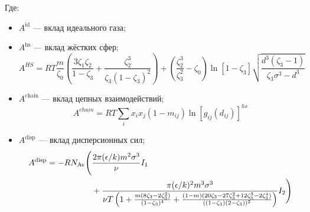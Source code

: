 \documentclass[a4paper,12pt]{article}
\begin{document}
    Где:
    \begin{itemize}
        \item \( A^{\text{id}} \) — вклад идеального газа;
        \item \( A^{\text{hs}} \) — вклад жёстких сфер;
          \[
          A^{HS} = RT \frac{m}{\zeta_0} \left( \frac{3 \zeta_1 \zeta_2}{1 - \zeta_3} + \frac{\zeta_2^3}{\zeta_3 (1 - \zeta_3)^2} \right) + \left( \frac{\zeta_2^3}{\zeta_3^2} - \zeta_0 \right) \ln [1 - \zeta_3] \sqrt{\frac{d^3 (\zeta_3 - 1)}{\zeta_3 \sigma^3 - d^3}}
          \]
        \item \( A^{\text{chain}} \) — вклад цепных взаимодействий;
          \[
          A^{chain} = RT \sum_i x_i x_j (1 - m_{ij}) \ln [g_{ij} (d_{ij})]^{hs}
          \]
        \item \( A^{\text{disp}} \) — вклад дисперсионных сил;
          \begin{align}
          A^{\text{disp}} = -RN_{\text{Av}} \Bigg( & \frac{2 \pi (\epsilon / k) m^2 \sigma^3}{\nu} I_1 \notag \\
          & + \frac{\pi (\epsilon / k)^2 m^3 \sigma^3}{\nu T \left(
          1 + \frac{m (8 \zeta_3 - 2 \zeta_3^2)}{(1 - \zeta_3)^4} +
          \frac{(1 - m)(20 \zeta_3 - 27 \zeta_3^2 + 12 \zeta_3^3 - 2 \zeta_3^4)}{((1 - \zeta_3)(2 - \zeta_3))^2}
          \right)} I_2 \Bigg)
          \end{align}
    

\end{itemize}
\end{document}
